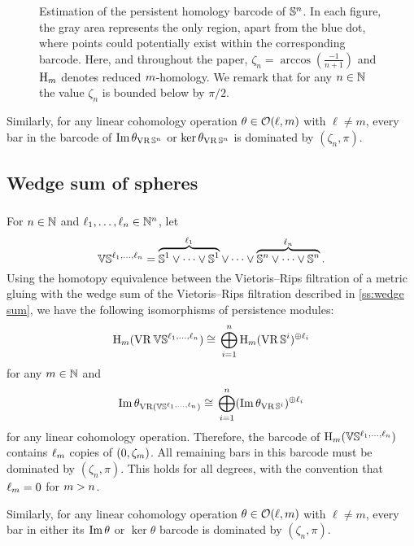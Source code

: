 \begin{figure}[ht]
	\centering
	
	\caption{Estimation of the persistent homology barcode of $\mathbb{S}^n$.
	In each figure, the gray area represents the only region, apart from the blue dot, where points could potentially exist within the corresponding barcode.
	Here, and throughout the paper, $\zeta_n = \arccos(\tfrac{-1}{n+1})$ and $\mathrm{H}_m $ denotes reduced $m$-homology.
	We remark that for any \(n \in \mathbb{N}\) the value \(\zeta_n\) is bounded below by \(\pi/2\).}
	\label{fig:Sk}
\end{figure}

Similarly, for any linear cohomology operation $\theta \in \mathcal{O}(\ell,m)$ with $\ell \neq m$, every bar in the barcode of $\operatorname{Im}\theta_{\operatorname{VR}\mathbb{S}^n}$ or $\ker\theta_{\operatorname{VR}\mathbb{S}^n}$ is dominated by $(\zeta_n,\pi)$.

\subsection{Wedge sum of spheres}

\subsubsection{}

For $n \in \mathbb{N}$ and $\ell_1, \dots, \ell_n \in \mathbb{N}^n$, let
\[
\mathbb{V}\mathbb{S}^{\ell_1,\dots,\ell_n} =
\overbrace{\mathbb{S}^1\vee\dots\vee\mathbb{S}^1}^{\ell_1} \vee\dots\vee \overbrace{\mathbb{S}^n\vee\dots\vee\mathbb{S}^n}^{\ell_n}.
\]
Using the homotopy equivalence between the Vietoris--Rips filtration of a metric gluing with the wedge sum of the Vietoris--Rips filtration described in \cref{ss:wedge sum}, we have the following isomorphisms of persistence modules:
\[
\mathrm{H}_m (\operatorname{VR}\mathbb{V}\mathbb{S}^{\ell_1,\dots,\ell_n}) \cong \, \bigoplus_{i=1}^n \mathrm{H}_m (\operatorname{VR}\mathbb{S}^i)^{\oplus \ell_i}
\]
for any \(m \in \mathbb{N}\) and
\[
\operatorname{Im}\theta_{\operatorname{VR}(\mathbb{V}\mathbb{S}^{\ell_1,\dots,\ell_n})} \cong \, \bigoplus_{i=1}^n (\operatorname{Im}\theta_{\operatorname{VR}\mathbb{S}^i})^{\oplus \ell_i}
\]
for any linear cohomology operation.
Therefore, the barcode of $\mathrm{H}_m(\mathbb{V}\mathbb{S}^{\ell_1,\dots,\ell_n})$ contains $\ell_m$ copies of $(0,\zeta_m)$.
All remaining bars in this barcode must be dominated by $(\zeta_n, \pi)$.
This holds for all degrees, with the convention that $\ell_m = 0$ for $m > n$.

Similarly, for any linear cohomology operation $\theta \in \mathcal{O}(\ell,m)$ with $\ell \neq m$, every bar in either its $\operatorname{Im}\theta$ or $\ker\theta$ barcode is dominated by $(\zeta_n, \pi)$.

